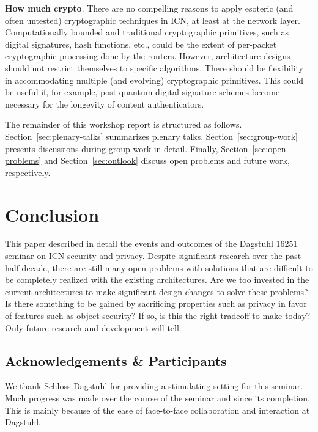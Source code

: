 \documentclass{sig-alternate-10pt}
\begin{document}
\noindent
{\bf How much crypto}. There are no compelling reasons to apply esoteric (and often untested)
cryptographic techniques in ICN, at least at the network layer. Computationally bounded
and traditional cryptographic primitives, such as digital signatures, hash functions, etc.,
could be the extent of per-packet cryptographic processing done by the routers.  %
However, architecture designs should not restrict themselves
to specific algorithms. There should be flexibility in accommodating
multiple (and evolving) cryptographic primitives. This could be useful if, for example,
post-quantum digital signature schemes become necessary for the longevity of content authenticators.

The remainder of this workshop report is structured as follows.
Section~\ref{sec:plenary-talks} summarizes plenary talks.
Section~\ref{sec:group-work} presents discussions during group work in detail.
Finally, Section~\ref{sec:open-problems} and Section~\ref{sec:outlook} discuss open problems and future work, respectively.






\section{Conclusion}
This paper described in detail the events and outcomes of the Dagstuhl 16251
seminar on ICN security and privacy. Despite significant research over the past
half decade, there are still many open problems with solutions that are difficult
to be completely realized with the existing architectures. Are we too invested in the current architectures to make significant design changes to solve these problems? Is there something to be gained by sacrificing properties such as privacy in favor of features such as object security? If so, is this the right tradeoff to make today? Only future research and development will tell.

\subsection*{Acknowledgements \& Participants}
We thank Schloss Dagstuhl for providing a stimulating setting for this seminar. Much
progress was made over the course of the seminar and since its completion. This is mainly
because of the ease of face-to-face collaboration and interaction at Dagstuhl.
\end{document}
